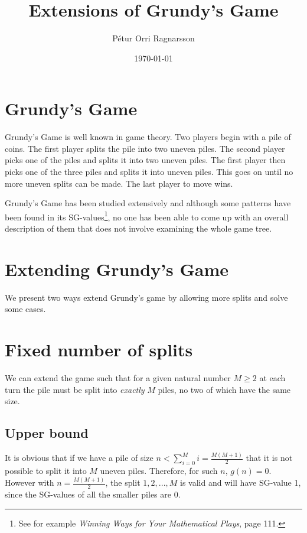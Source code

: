 \documentclass[english,a4paper,twoside]{amsart}
\theoremstyle{lemma}
\begin{document}
\title[exesefsfe]{Extensions of Grundy's Game}

\author{Pétur Orri Ragnarsson}

\date{\today}

\maketitle

\thispagestyle{empty}

\section{Grundy's Game}
Grundy's Game is well known in game theory. Two players begin with a pile of coins.
The first player splits the pile into two uneven piles. The second player picks one of the
piles and splits it into two uneven piles. The first player then picks one of the three piles
and splits it into uneven piles. This goes on until no more uneven splits can be made. The
last player to move wins.

Grundy's Game has been studied extensively and although some patterns have been found
in its SG-values\footnote{See for example \emph{Winning Ways for Your Mathematical Plays}, page 111.},
no one has been able to come up with an overall description of them
that does not involve examining the whole game tree.

\section{Extending Grundy's Game}
We present two ways extend Grundy's game by allowing more splits and solve some cases.

\section{Fixed number of splits}
We can extend the game such that for a given natural number $M \geq 2$ at each turn the
pile must be split into \emph{exactly} $M$ piles, no two of which have the same size.

\subsection{Upper bound}
It is obvious that if we have a pile of size $n < \sum_{i=0}^{M} i = \frac{M(M+1)}{2}$ that it is
not possible to split it into $M$ uneven piles. Therefore, for such $n$, $g(n) = 0$.
However with $n = \frac{M(M+1)}{2}$, the split $1, 2, ..., M$ is valid and will have SG-value 1,
since the SG-values of all the smaller piles are 0.
\end{document}
